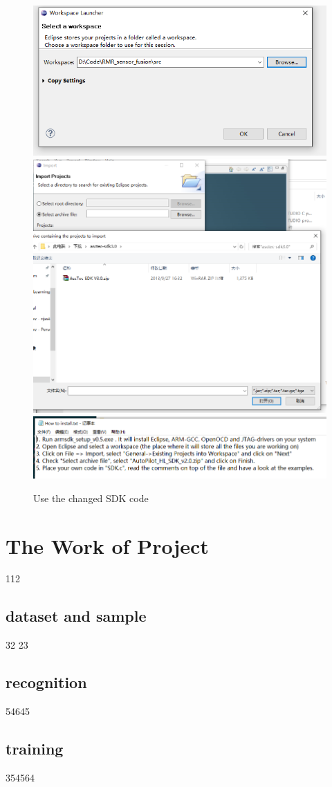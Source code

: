 \documentclass[twoside,colorbacktitle,accentcolor=tud6a]{tudexercise}
\begin{document}
  \begin{figure}[ht] 	
  	
  	\includegraphics[width=0.5\linewidth]{fig/Note1_2}
  	\includegraphics[width=0.5\linewidth]{fig/Note1_4}  
  	\includegraphics[width=0.9\linewidth]{fig/Note1_3}
  	\caption{Use the changed SDK code}  	
  	\label{fig:note12}
  \end{figure}
  
  
  
  \section{The Work of Project}
  112
   
  \subsection{dataset and sample}
  
   32
   23 

  

  
  
  
  \subsection{recognition}
 54645
    

  \subsection{training}
	354564
  
  
  
 
\end{document}
